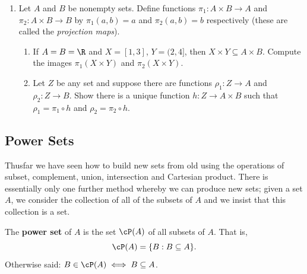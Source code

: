 \begin{enumerate}
	\item Let $A$ and $B$ be nonempty sets. Define functions $\pi_1 : A \times B \to A$ and $\pi_2 : A \times B \to B$ by $\pi_1(a,b) = a$ and $\pi_2(a,b) = b$ respectively (these are called the \emph{projection maps}). 
\begin{enumerate}
    \item If $A = B = \R$ and $X = [1,3]$, $Y = (2,4]$, then $X \times Y \subseteq A \times B$. Compute the images $\pi_1(X \times Y)$ and $\pi_2(X \times Y)$.
    \item Let $Z$ be any set and suppose there are functions $\rho_1 : Z \to A$ and $\rho_2 : Z \to B$. Show there is a unique function $h : Z \to A \times B$ such that $\rho_1 = \pi_1 \circ h$ and $\rho_2 = \pi_2 \circ h$.
\end{enumerate}
\end{enumerate}
\newpage

\subsection{Power Sets}

Thusfar we have seen how to build new sets from old using the operations of subset, complement, union, intersection and Cartesian product. There is essentially only one further method whereby we can produce new sets; given a set $A$, we consider the collection of all of the subsets of $A$ and we insist that this collection is a set.

\begin{defn}
The \textbf{power set} of $A$ is the set $\cP(A)$ of all subsets of $A$. That is,
\[\cP(A)=\{B:B\subseteq A\}.\]
Otherwise said: $B\in\cP(A)\iff B\subseteq A$.
\end{defn}

